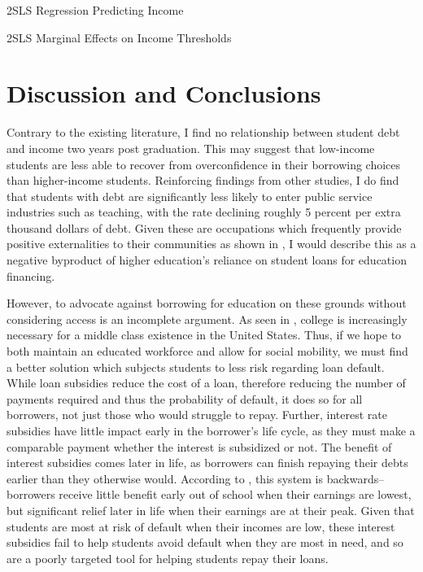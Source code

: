 \documentclass[12pt]{article}
\newcommand{\regs}{../Analysis/Regressions/Output/}
\begin{document}
	\begin{table}
		\centering
		\caption{2SLS Regression Predicting Income}
		\resizebox{\textwidth}{!}{		
			
		}
		\label{incomeRes}
	\end{table}

	\begin{table}
		\centering
		\caption{2SLS Marginal Effects on Income Thresholds}
		\resizebox{\textwidth}{!}{		
			
		}
		\label{incomeResmarg}
	\end{table}
	
	\section{Discussion and Conclusions}
	
	Contrary to the existing literature, I find no relationship between student debt and income two years post graduation. This may suggest that low-income students are less able to recover from overconfidence in their borrowing choices than higher-income students. Reinforcing findings from other studies, I do find that students with debt are significantly less likely to enter public service industries such as teaching, with the rate declining roughly 5 percent per extra thousand dollars of debt. Given these are occupations which frequently provide positive externalities to their communities as shown in \textcite{benshem1991}, I would describe this as a negative byproduct of higher education's reliance on student loans for education financing.
	
	However, to advocate against borrowing for education on these grounds without considering access is an incomplete argument. As seen in \textcite{abel2014}, college is increasingly necessary for a middle class existence in the United States. Thus, if we hope to both maintain an educated workforce and allow for social mobility, we must find a better solution which subjects students to less risk regarding loan default. While loan subsidies reduce the cost of a loan, therefore reducing the number of payments required and thus the probability of default, it does so for all borrowers, not just those who would struggle to repay. Further, interest rate subsidies have little impact early in the borrower's life cycle, as they must make a comparable payment whether the interest is subsidized or not. The benefit of interest subsidies comes later in life, as borrowers can finish repaying their debts earlier than they otherwise would. According to \textcite{dynarski2015}, this system is backwards--borrowers receive little benefit early out of school when their earnings are lowest, but significant relief later in life when their earnings are at their peak. Given that students are most at risk of default when their incomes are low, these interest subsidies fail to help students avoid default when they are most in need, and so are a poorly targeted tool for helping students repay their loans. 
	
\end{document}

